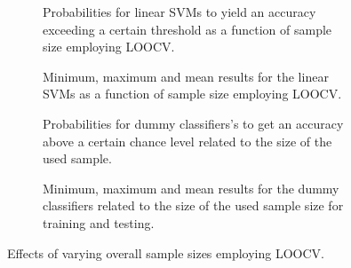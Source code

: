 \documentclass{article}
\begin{document}
    \begin{figure}
        \captionsetup[subfigure]{justification=justified,singlelinecheck=false}
        \begin{subfigure}[t]{0.61\textwidth}
            
            \caption{Probabilities for linear SVMs to yield an accuracy exceeding a certain threshold as a function of sample size employing LOOCV. }
        \end{subfigure}
        \hspace{3.0mm}
        \begin{subfigure}[t]{0.34\textwidth}
            
            \caption{Minimum, maximum and mean results for the linear SVMs as a function of sample size employing LOOCV.}
        \end{subfigure}

        \vspace{3.0mm}

        \begin{subfigure}[t]{0.61\textwidth}
            
            \caption{Probabilities for dummy classifiers’s to get an accuracy above a certain chance level related to the size of the used sample.}
        \end{subfigure}
        \hspace{3.0mm}
        \begin{subfigure}[t]{0.34\textwidth}
            
            \caption{Minimum, maximum and mean results for the dummy classifiers related to the size of the used sample size for training and testing.}
        \end{subfigure}
        \caption{Effects of varying overall sample sizes employing LOOCV.}
        \label{fig:overall_sample_size_effects}
    \end{figure}
\end{document}

